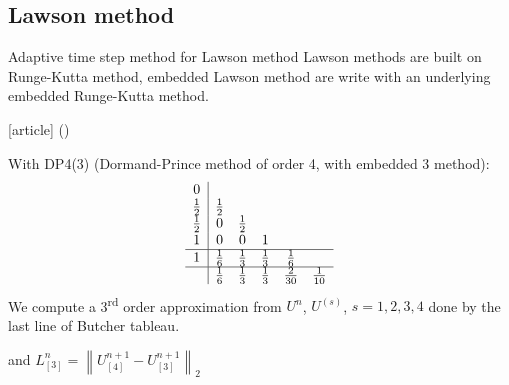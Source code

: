 \documentclass{beamer}
\newcommand{\customcite}[1]{\citeauthor{#1} (\citeyear{#1})}
\begin{document}
\subsection{Lawson method}
\begin{frame}{Adaptive time step method for Lawson method}
  Lawson methods are built on Runge-Kutta method, embedded Lawson method are write with an underlying embedded Runge-Kutta method.

  \begin{thebibliography}{9}
    [article]
     \customcite{Dormand:1978}
  \end{thebibliography}
  With DP4(3) (Dormand-Prince method of order 4, with embedded 3 method):
  $$
    \begin{array}{c|ccccc}
      0           & \\
      \frac{1}{2} & \frac{1}{2} \\
      \frac{1}{2} & 0           & \frac{1}{2} \\
      1           & 0           & 0           & 1           \\
    \hline
      1           & \frac{1}{6} & \frac{1}{3} & \frac{1}{3} & \frac{1}{6} \\
    \hline
                  & \frac{1}{6} & \frac{1}{3} & \frac{1}{3} & \frac{2}{30} & \frac{1}{10}
    \end{array}
  $$
  We compute a 3\textsuperscript{rd} order approximation from $U^n$, $U^{(s)}$, $s=1,2,3,4$ done by the last line of Butcher tableau.

  and $L^{n}_{[3]} = \left\| U^{n+1}_{[4]} - U^{n+1}_{[3]} \right\|_2$
\end{frame}
\end{document}
